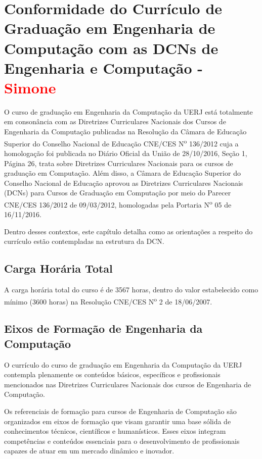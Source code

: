 \chapter{Conformidade do Currículo de Graduação em Engenharia de Computação
com as DCNs de Engenharia e Computação - \textcolor{red}{Simone}}


O curso de graduação em Engenharia da Computação da UERJ está totalmente em
consonância com as Diretrizes Curriculares Nacionais dos Cursos de Engenharia da Computação publicadas na Resolução da Câmara de Educação Superior do Conselho Nacional de Educação   CNE/CES N\textsuperscript{o}  136/2012 cuja a homologação foi publicada no Diário Oficial da União de 28/10/2016, Seção 1, Página 26, trata sobre Diretrizes Curriculares Nacionais para os cursos de graduação em Computação. Além disso, a Câmara de Educação Superior do Conselho Nacional de Educação aprovou as Diretrizes Curriculares Nacionais (DCNs) para Cursos 
de Graduação em Computação por meio do Parecer CNE/CES 136/2012 de 09/03/2012, homologadas pela Portaria N\textsuperscript{o} 05 de 16/11/2016.

Dentro desses contextos, este capítulo detalha como as orientações a respeito do currículo estão contempladas na estrutura da DCN.


\section{Carga Horária Total}

A carga horária total do curso é de 3567 horas, dentro do valor estabelecido como mínimo (3600 horas) na Resolução CNE/CES N\textsuperscript{o} 2 de 18/06/2007.


\section{Eixos de Formação de Engenharia da Computação}

O currículo do curso de graduação em Engenharia da Computação da UERJ contempla plenamente os conteúdos básicos, específicos e profissionais mencionados nas Diretrizes Curriculares Nacionais dos cursos de Engenharia de Computação. 

Os referenciais de formação para cursos de Engenharia de Computação são organizados em eixos de formação que visam garantir uma base sólida de conhecimentos técnicos, científicos e humanísticos. Esses eixos integram competências e conteúdos essenciais para o desenvolvimento de profissionais capazes de atuar em um mercado dinâmico e inovador. 

